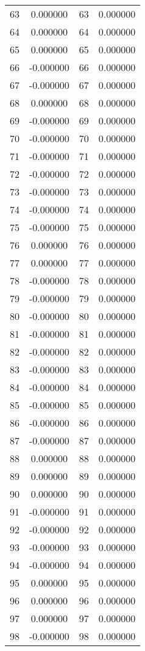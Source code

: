 \documentclass[12pt]{article}
\begin{document}
\begin{longtable}{@{}cccc@{}}
63 & 0.000000 & 63 & 0.000000 \\
64 & 0.000000 & 64 & 0.000000 \\
65 & 0.000000 & 65 & 0.000000 \\
66 & -0.000000 & 66 & 0.000000 \\
67 & -0.000000 & 67 & 0.000000 \\
68 & 0.000000 & 68 & 0.000000 \\
69 & -0.000000 & 69 & 0.000000 \\
70 & -0.000000 & 70 & 0.000000 \\
71 & -0.000000 & 71 & 0.000000 \\
72 & -0.000000 & 72 & 0.000000 \\
73 & -0.000000 & 73 & 0.000000 \\
74 & -0.000000 & 74 & 0.000000 \\
75 & -0.000000 & 75 & 0.000000 \\
76 & 0.000000 & 76 & 0.000000 \\
77 & 0.000000 & 77 & 0.000000 \\
78 & -0.000000 & 78 & 0.000000 \\
79 & -0.000000 & 79 & 0.000000 \\
80 & -0.000000 & 80 & 0.000000 \\
81 & -0.000000 & 81 & 0.000000 \\
82 & -0.000000 & 82 & 0.000000 \\
83 & -0.000000 & 83 & 0.000000 \\
84 & -0.000000 & 84 & 0.000000 \\
85 & -0.000000 & 85 & 0.000000 \\
86 & -0.000000 & 86 & 0.000000 \\
87 & -0.000000 & 87 & 0.000000 \\
88 & 0.000000 & 88 & 0.000000 \\
89 & 0.000000 & 89 & 0.000000 \\
90 & 0.000000 & 90 & 0.000000 \\
91 & -0.000000 & 91 & 0.000000 \\
92 & -0.000000 & 92 & 0.000000 \\
93 & -0.000000 & 93 & 0.000000 \\
94 & -0.000000 & 94 & 0.000000 \\
95 & 0.000000 & 95 & 0.000000 \\
96 & 0.000000 & 96 & 0.000000 \\
97 & 0.000000 & 97 & 0.000000 \\
98 & -0.000000 & 98 & 0.000000 \\

\end{longtable}
\end{document}
